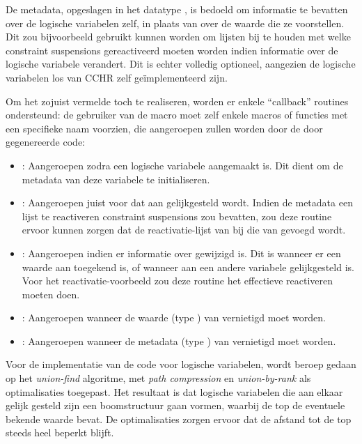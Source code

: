 De metadata, opgeslagen in het datatype , is bedoeld om informatie te bevatten over de logische variabelen zelf, in plaats van over de waarde die ze voorstellen. Dit zou bijvoorbeeld gebruikt kunnen worden om lijsten bij te houden met welke constraint suspensions gereactiveerd moeten worden indien informatie over de logische variabele verandert. Dit is echter volledig optioneel, aangezien de logische variabelen los van CCHR zelf ge\"implementeerd zijn.

Om het zojuist vermelde toch te realiseren, worden er enkele ``callback'' routines ondersteund: de gebruiker van de  macro moet zelf enkele macros of functies met een specifieke naam voorzien, die aangeroepen zullen worden door de door  gegenereerde code: \begin{itemize}
  \item {}: Aangeroepen zodra een logische variabele  aangemaakt is. Dit dient om de metadata van deze variabele te initialiseren.
  \item {}: Aangeroepen juist voor dat  aan  gelijkgesteld wordt. Indien de metadata een lijst te reactiveren constraint suspensions zou bevatten, zou deze routine ervoor kunnen zorgen dat de reactivatie-lijst van  bij die van  gevoegd wordt.
  \item {}: Aangeroepen indien er informatie over  gewijzigd is. Dit is wanneer er een waarde aan toegekend is, of wanneer  aan een andere variabele gelijkgesteld is. Voor het reactivatie-voorbeeld zou deze routine het effectieve reactiveren moeten doen.
  \item {}: Aangeroepen wanneer de waarde (type ) van  vernietigd moet worden.
  \item {}: Aangeroepen wanneer de metadata (type ) van  vernietigd moet worden.
\end{itemize}

Voor de implementatie van de code voor logische variabelen, wordt beroep gedaan op het {\em union-find} algoritme, met {\em path compression} en {\em union-by-rank} als optimalisaties toegepast. Het resultaat is dat logische variabelen die aan elkaar gelijk gesteld zijn een boomstructuur gaan vormen, waarbij de top de eventuele bekende waarde bevat. De optimalisaties zorgen ervoor dat de afstand tot de top steeds heel beperkt blijft.

